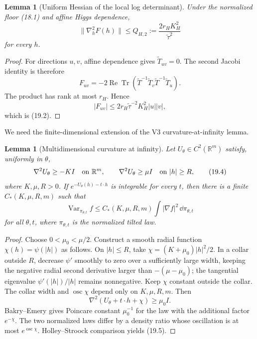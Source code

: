 \documentclass[11pt]{article}
\newtheorem{lemma}[theorem]{Lemma}
\theoremstyle{remark}
\begin{document}
\begin{lemma}[Uniform Hessian of the local log determinant]
\label{lem:v15v19-hessian}
Under the normalized floor (18.1) and affine Higgs dependence,
\[
 \boxed{
 \|\nabla_h^2F(h)\|
 \le Q_{H,2}:=
 \frac{2r_HK_H^2}{\widetilde\tau^2}}                        \tag{19.2}
\]
for every \(h\).
\end{lemma}

\begin{proof}
For directions \(u,v\), affine dependence gives
\(\widetilde T_{uv}=0\).  The second Jacobi identity is therefore
\[
 F_{uv}
 =
 -2\operatorname{Re}\operatorname{Tr}
 \left(
 \widetilde T^{-1}\widetilde T_v
 \widetilde T^{-1}\widetilde T_u
 \right).                                                   \tag{19.3}
\]
The product has rank at most \(r_H\).  Hence
\[
 |F_{uv}|
 \le
 2r_H\widetilde\tau^{-2}K_H^2|u||v|,
\]
which is (19.2).
\end{proof}

We need the finite-dimensional extension of the V3
curvature-at-infinity lemma.

\begin{lemma}[Multidimensional curvature at infinity]
\label{lem:v15v19-curvature}
Let \(U_\theta\in C^2(\mathbb R^m)\) satisfy, uniformly in
\(\theta\),
\[
 \nabla^2U_\theta\ge-KI\quad\hbox{on }\mathbb R^m,\qquad
 \nabla^2U_\theta\ge\mu I\quad\hbox{on }|h|\ge R,            \tag{19.4}
\]
where \(K,\mu,R>0\).  If
\(e^{-U_\theta(h)-t\cdot h}\) is integrable for every \(t\), then
there is a finite \(C_*(K,\mu,R,m)\) such that
\[
 \operatorname{Var}_{\pi_{\theta,t}}f
 \le
 C_*(K,\mu,R,m)
 \int|\nabla f|^2\,\dd\pi_{\theta,t}                        \tag{19.5}
\]
for all \(\theta,t\), where
\(\pi_{\theta,t}\) is the normalized tilted law.
\end{lemma}

\begin{proof}
Choose \(0<\mu_0<\mu/2\).  Construct a smooth radial function
\(\chi(h)=\psi(|h|)\) as follows.  On \(|h|\le R\), take
\(\chi=(K+\mu_0)|h|^2/2\).  In a collar outside \(R\), decrease
\(\psi'\) smoothly to zero over a sufficiently large width, keeping
the negative radial second derivative larger than
\(-(\mu-\mu_0)\); the tangential eigenvalue
\(\psi'(|h|)/|h|\) remains nonnegative.  Keep \(\chi\) constant
outside the collar.  The collar width and
\(\operatorname{osc}\chi\) depend only on
\(K,\mu,R,m\).  Then
\[
 \nabla^2(U_\theta+t\cdot h+\chi)\ge\mu_0I.                 \tag{19.6}
\]
Bakry--Emery gives Poincare constant \(\mu_0^{-1}\) for the law
with the additional factor \(e^{-\chi}\).  The two normalized laws
differ by a density ratio whose oscillation is at most
\(e^{\operatorname{osc}\chi}\).  Holley--Stroock comparison yields
(19.5).
\end{proof}
\end{document}
